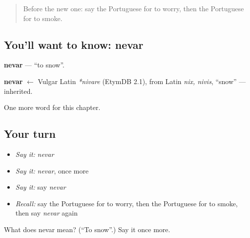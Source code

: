 \label{lesson:PT-C233-nevar}



\begin{quote}
Before the new one: say the Portuguese for to worry, then the Portuguese for to smoke.
\end{quote}

\subsection*{You'll want to know: nevar}
\textbf{nevar} — \textquotedblleft{}to snow\textquotedblright{}.

\begin{cousinweb}
\textbf{nevar} $\leftarrow$ Vulgar Latin \emph{*nivare} (EtymDB 2.1), from Latin \emph{nix, nivis}, \textquotedblleft{}snow\textquotedblright{} — inherited.
\end{cousinweb}

\begin{grammarlens}[title={What you've built}]
One more word for this chapter.
\end{grammarlens}

\subsection*{Your turn}
\begin{itemize}
\raggedright
  \item \emph{Say it:} \emph{nevar}
  \item \emph{Say it:} \emph{nevar}, once more
  \item \emph{Say it:} say \emph{nevar}
  \item \emph{Recall:} say the Portuguese for to worry, then the Portuguese for to smoke, then say \emph{nevar} again
\end{itemize}

\begin{tcolorbox}[breakable,colback=teal!4,colframe=teal!35!black,title={Before you move on}]
What does nevar mean? (\textquotedblleft{}To snow\textquotedblright{}.) Say it once more.
\end{tcolorbox}
